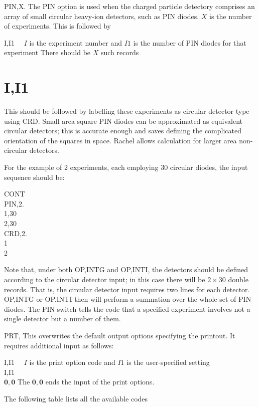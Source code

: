 \documentclass[10pt]{article}
\begin{document}
PIN,X. The PIN option is used when the charged particle detectory comprises an array of small circular heavy-ion detectors, such as PIN diodes. $X$ is the number of experiments. This is followed by

I,I1 $\quad I$ is the experiment number and $I 1$ is the number of PIN diodes for that experiment There should be $X$ such records

\section*{I,I1}
This should be followed by labelling these experiments as circular detector type using CRD. Small area square PIN diodes can be approximated as equivalent circular detectors; this is accurate enough and saves defining the complicated orientation of the squares in space. Rachel allows calculation for larger area non-circular detectors.

For the example of 2 experiments, each employing 30 circular diodes, the input sequence should be:

CONT\\
PIN,2.\\
1,30\\
2,30\\
CRD,2.\\
1\\
2

Note that, under both OP,INTG and OP,INTI, the detectors should be defined according to the circular detector input; in this case there will be $2 \times 30$ double records. That is, the circular detector input requires two lines for each detector. OP,INTG or OP,INTI then will perform a summation over the whole set of PIN diodes. The PIN switch tells the code that a specified experiment involves not a single detector but a number of them.

PRT, This overwrites the default output options specifying the printout. It requires additional input as follows:

I,I1 $\quad I$ is the print option code and $I 1$ is the user-specified setting\\
I,I1\\
$\mathbf{0 , 0}$ The $\mathbf{0 , 0}$ ends the input of the print options.

The following table lists all the available codes
\end{document}
